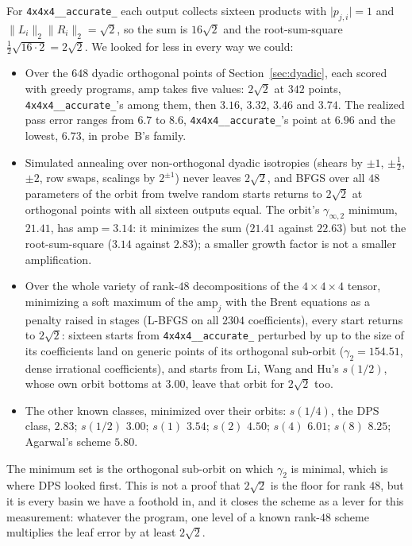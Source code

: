 \documentclass[11pt]{article}
\theoremstyle{remark}
\newcommand{\ginf}{\gamma_{\infty,2}}
\newcommand{\acct}{\texttt{4x4x4\_\allowbreak 48\_\allowbreak accurate\_\allowbreak 262}\xspace}
\begin{document}
For \acct each output
collects sixteen products with $\lvert p_{j,i}\rvert=1$ and
$\lVert L_i\rVert_2\lVert R_i\rVert_2=\sqrt2$, so the sum is $16\sqrt2$
and the root-sum-square $\frac12\sqrt{16\cdot2}=2\sqrt2$.  We looked
for less in every way we could:
\begin{itemize}
\item Over the $648$ dyadic orthogonal points of Section~\ref{sec:dyadic},
  each scored with greedy programs, $\mathrm{amp}$ takes five values:
  $2\sqrt2$ at $342$ points, \acct's among them, then $3.16$, $3.32$,
  $3.46$ and $3.74$.  The realized pass error ranges from $6.7$ to $8.6$,
  \acct's point at $6.96$ and the lowest, $6.73$, in probe~B's family.
\item Simulated annealing over non-orthogonal dyadic isotropies (shears
  by $\pm1$, $\pm\frac12$, $\pm2$, row swaps, scalings by $2^{\pm1}$)
  never leaves $2\sqrt2$, and BFGS over all $48$ parameters of the orbit
  from twelve random starts returns to $2\sqrt2$ at orthogonal points
  with all sixteen outputs equal.  The orbit's $\ginf$ minimum, $21.41$,
  has $\mathrm{amp}=3.14$: it minimizes the sum ($21.41$ against
  $22.63$) but not the root-sum-square ($3.14$ against $2.83$); a
  smaller growth factor is not a smaller amplification.
\item Over the whole variety of rank-$48$ decompositions of the
  $4\times4\times4$ tensor, minimizing a soft maximum of the
  $\mathrm{amp}_j$ with the Brent equations as a penalty raised in
  stages (L-BFGS on all $2304$ coefficients), every start returns to
  $2\sqrt2$: sixteen starts from \acct perturbed by up to the size of
  its coefficients land on generic points of its orthogonal sub-orbit
  ($\gamma_2=154.51$, dense irrational coefficients), and starts from Li,
  Wang and Hu's $s(1/2)$, whose own orbit bottoms at $3.00$, leave that
  orbit for $2\sqrt2$ too.
\item The other known classes, minimized over their orbits: $s(1/4)$,
  the DPS class, $2.83$; $s(1/2)$ $3.00$; $s(1)$ $3.54$; $s(2)$ $4.50$;
  $s(4)$ $6.01$; $s(8)$ $8.25$; Agarwal's scheme $5.80$.
\end{itemize}
The minimum set is the orthogonal sub-orbit on which $\gamma_2$ is
minimal, which is where DPS looked first.  This is not a proof that
$2\sqrt2$ is the floor for rank $48$, but it is every basin we have a
foothold in, and it closes the scheme as a lever for this measurement:
whatever the program, one level of a known rank-$48$ scheme multiplies
the leaf error by at least $2\sqrt2$.
\end{document}

